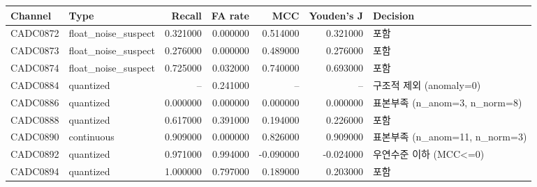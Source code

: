 \begin{tabular}{llrrrrl}
\toprule
Channel & Type & Recall & FA rate & MCC & Youden's J & Decision \\
\midrule
CADC0872 & float\_noise\_suspect & 0.321000 & 0.000000 & 0.514000 & 0.321000 & 포함 \\
CADC0873 & float\_noise\_suspect & 0.276000 & 0.000000 & 0.489000 & 0.276000 & 포함 \\
CADC0874 & float\_noise\_suspect & 0.725000 & 0.032000 & 0.740000 & 0.693000 & 포함 \\
CADC0884 & quantized & -- & 0.241000 & -- & -- & 구조적 제외 (anomaly=0) \\
CADC0886 & quantized & 0.000000 & 0.000000 & 0.000000 & 0.000000 & 표본부족 (n\_anom=3, n\_norm=8) \\
CADC0888 & quantized & 0.617000 & 0.391000 & 0.194000 & 0.226000 & 포함 \\
CADC0890 & continuous & 0.909000 & 0.000000 & 0.826000 & 0.909000 & 표본부족 (n\_anom=11, n\_norm=3) \\
CADC0892 & quantized & 0.971000 & 0.994000 & -0.090000 & -0.024000 & 우연수준 이하 (MCC<=0) \\
CADC0894 & quantized & 1.000000 & 0.797000 & 0.189000 & 0.203000 & 포함 \\
\bottomrule
\end{tabular}
